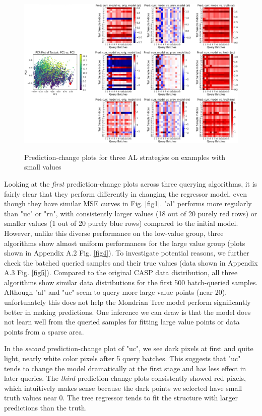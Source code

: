 \documentclass{article}
\begin{document}
\begin{figure}[h]
\centering
 \includegraphics[width=0.876\linewidth]{Figure2.png}
 {
 }
 \caption{Prediction-change plots for three AL strategies on examples with small values}
 \centering
\label{fig2}
\end{figure}
Looking at the \textit{first} prediction-change plots across three querying algorithms, it is fairly clear that they perform differently in changing the regressor model, even though they have similar MSE curves in Fig. \ref{fig1}. "al" performs more regularly than "uc" or "rn", with consistently larger values (18 out of 20 purely red rows) or smaller values (1 out of 20 purely blue rows) compared to the initial model. However, unlike this diverse performance on the low-value group, three algorithms show almost uniform performances for the large value group (plots shown in Appendix A.2 Fig. \ref{fig4}). To investigate potential reasons, we further check the batched queried samples and their true values (data shown in Appendix A.3 Fig. \ref{fig5}). Compared to the original CASP data distribution, all three algorithms show similar data distributions for the first 500 batch-queried samples. Although "al" and "uc" seem to query more large value points (near 20), unfortunately this does not help the Mondrian Tree model perform significantly better in making predictions. One inference we can draw is that the model does not learn well from the queried samples for fitting large value points or data points from a sparse area. 

In the \textit{second} prediction-change plot of "uc", we see dark pixels at first and quite light, nearly white color pixels after 5 query batches. This suggests that "uc" tends to change the model dramatically at the first stage and has less effect in later queries. The \textit{third} prediction-change plots consistently showed red pixels, which intuitively makes sense because the dark points we selected have small truth values near 0. The tree regressor tends to fit the structure with larger predictions than the truth. 
\end{document}
